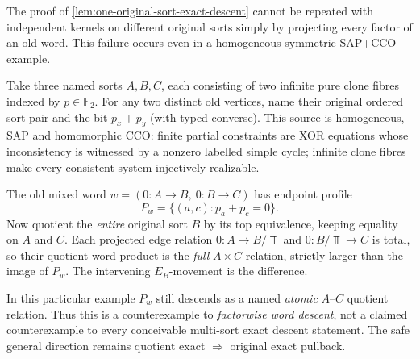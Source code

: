 \begin{remark}
\label{rem:mixed-word-projection-failure}
The proof of
\cref{lem:one-original-sort-exact-descent}
cannot be repeated with independent kernels on
different original sorts simply by projecting
every factor of an old word. This failure occurs
even in a homogeneous symmetric SAP+CCO example.

Take three named sorts $A,B,C$, each consisting of
two infinite pure clone fibres indexed by
$p\in\mathbb F_2$. For any two distinct old
vertices, name their original ordered sort pair
and the bit $p_x+p_y$ (with typed converse).
This source is homogeneous, SAP and homomorphic
CCO: finite partial constraints are XOR
equations whose inconsistency is witnessed by
a nonzero labelled simple cycle; infinite clone
fibres make every consistent system injectively
realizable.

The old mixed word $w=(0:A\to B,\ 0:B\to C)$
has endpoint profile
\[
 P_w=\{(a,c):p_a+p_c=0\}.
\]
Now quotient the \emph{entire} original sort $B$
by its top equivalence, keeping equality on
$A$ and $C$. Each projected edge relation
$0:A\to B/\Top$ and
$0:B/\Top\to C$ is total, so their
quotient word product is the \emph{full}
$A\times C$ relation, strictly larger than
the image of $P_w$. The intervening
$E_B$-movement is the difference.

In this particular example $P_w$ still
descends as a named \emph{atomic} $A$--$C$
quotient relation. Thus this is a
counterexample to \emph{factorwise word
descent}, not a claimed counterexample
to every conceivable multi-sort exact
descent statement. The safe general
direction remains quotient exact $\Rightarrow$
original exact pullback.
\end{remark}

